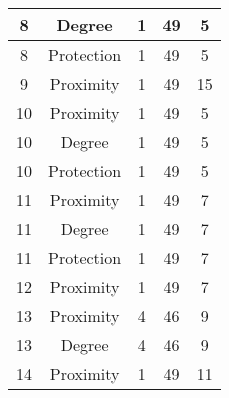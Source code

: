 \documentclass[results.tex]{subfiles}
\begin{document}
\begin{center}
\begin{tabular}{| c || c | c | c | c |}
            \hline
            8                       & Degree                       & 1                      & 49                      & 5                    \\
            \hline
            8                       & Protection                   & 1                      & 49                      & 5                    \\
            \hline
            9                       & Proximity                    & 1                      & 49                      & 15                   \\
            \hline
            10                      & Proximity                    & 1                      & 49                      & 5                    \\
            \hline
            10                      & Degree                       & 1                      & 49                      & 5                    \\
            \hline
            10                      & Protection                   & 1                      & 49                      & 5                    \\
            \hline
            11                      & Proximity                    & 1                      & 49                      & 7                    \\
            \hline
            11                      & Degree                       & 1                      & 49                      & 7                    \\
            \hline
            11                      & Protection                   & 1                      & 49                      & 7                    \\
            \hline
            12                      & Proximity                    & 1                      & 49                      & 7                    \\
            \hline
            13                      & Proximity                    & 4                      & 46                      & 9                    \\
            \hline
            13                      & Degree                       & 4                      & 46                      & 9                    \\
            \hline
            14                      & Proximity                    & 1                      & 49                      & 11                   \\

\end{tabular}
\end{center}
\end{document}
